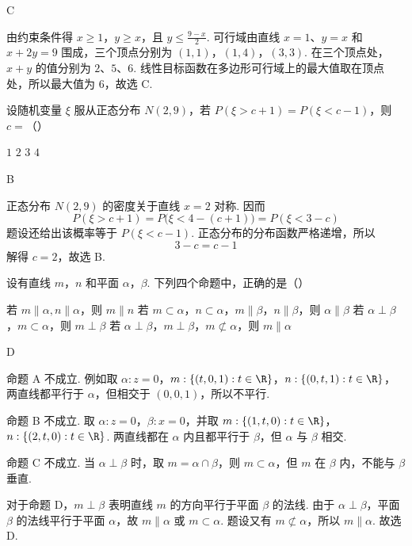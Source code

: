\begin{answer}
C
\end{answer}

\begin{solution}
由约束条件得 \(x\geqslant1\)，\(y\geqslant x\)，且 \(y\leqslant\frac{9-x}{2}\). 可行域由直线 \(x=1\)、\(y=x\) 和 \(x+2y=9\) 围成，三个顶点分别为
\((1,1)\)，\((1,4)\)，\((3,3)\).
在三个顶点处，\(x+y\) 的值分别为 \(2\)、\(5\)、\(6\). 线性目标函数在多边形可行域上的最大值取在顶点处，所以最大值为 \(6\)，故选 C.
\end{solution}

\begin{problem}
设随机变量 \(\xi\) 服从正态分布 \(N(2,9)\)，若 \(P(\xi > c + 1) = P(\xi < c - 1)\)，则 \(c =\)（\quad）

\choices
    {\(1\)}
    {\(2\)}
    {\(3\)}
    {\(4\)}
\end{problem}

\begin{answer}
B
\end{answer}

\begin{solution}
正态分布 \(N(2,9)\) 的密度关于直线 \(x=2\) 对称. 因而
\[
P(\xi>c+1)=P\bigl(\xi<4-(c+1)\bigr)=P(\xi<3-c)
\]
题设还给出该概率等于 \(P(\xi<c-1)\). 正态分布的分布函数严格递增，所以
\[
3-c=c-1
\]
解得 \(c=2\)，故选 B.
\end{solution}

\begin{problem}
设有直线 \(m\)，\(n\) 和平面 \(\alpha\)，\(\beta\). 下列四个命题中，正确的是（\quad）

\choices
    {若 \(m \parallel \alpha, n \parallel \alpha\)，则 \(m \parallel n\)}
    {若 \(m \subset \alpha\)，\(n \subset \alpha\)，\(m \parallel \beta\)，\(n \parallel \beta\)，则 \(\alpha \parallel \beta\)}
    {若 \(\alpha \perp \beta\)，\(m \subset \alpha\)，则 \(m \perp \beta\)}
    {若 \(\alpha \perp \beta\)，\(m \perp \beta\)，\(m \not\subset \alpha\)，则 \(m \parallel \alpha\)}
\end{problem}

\begin{answer}
D
\end{answer}

\begin{solution}
命题 A 不成立. 例如取 \(\alpha:z=0\)，\(m:\{(t,0,1):t\in\R\}\)，\(n:\{(0,t,1):t\in\R\}\)，两直线都平行于 \(\alpha\)，但相交于 \((0,0,1)\)，所以不平行.

命题 B 不成立. 取 \(\alpha:z=0\)，\(\beta:x=0\)，并取 \(m:\{(1,t,0):t\in\R\}\)，\(n:\{(2,t,0):t\in\R\}\). 两直线都在 \(\alpha\) 内且都平行于 \(\beta\)，但 \(\alpha\) 与 \(\beta\) 相交.

命题 C 不成立. 当 \(\alpha\perp\beta\) 时，取 \(m=\alpha\cap\beta\)，则 \(m\subset\alpha\)，但 \(m\) 在 \(\beta\) 内，不能与 \(\beta\) 垂直.

对于命题 D，\(m\perp\beta\) 表明直线 \(m\) 的方向平行于平面 \(\beta\) 的法线. 由于 \(\alpha\perp\beta\)，平面 \(\beta\) 的法线平行于平面 \(\alpha\)，故 \(m\parallel\alpha\) 或 \(m\subset\alpha\). 题设又有 \(m\not\subset\alpha\)，所以 \(m\parallel\alpha\). 故选 D.
\end{solution}

